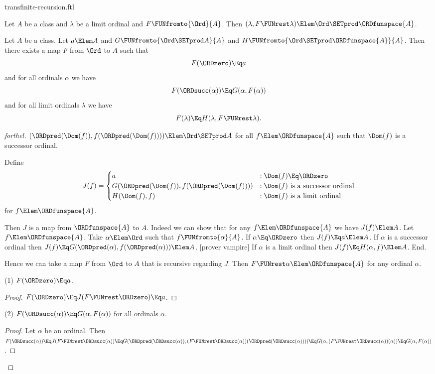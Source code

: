 \documentclass{stex}
\begin{document}
\begin{smodule}{transfinite-recursion.ftl}
\begin{lemma}[forthel]
  Let $A$ be a class and $\lambda$ be a limit ordinal and $F \FUNfromto{\Ord}{A}$.
  Then $(\lambda, F \FUNrest \lambda) \Elem \Ord \SETprod \ORDfunspace{A}$.
\end{lemma}

\begin{corollary}[forthel]
  Let $A$ be a class.
  Let $a \Elem A$ and $G \FUNfromto{\Ord \SETprod A}{A}$ and $H \FUNfromto{\Ord \SETprod \ORDfunspace{A}}{A}$.
  Then there exists a map $F$ from $\Ord$ to $A$ such that
  \[ F(\ORDzero) \Eq a \]
  and for all ordinals $\alpha$ we have
  \[ F(\ORDsucc(\alpha)) \Eq G(\alpha, F(\alpha)) \]
  and for all limit ordinals $\lambda$ we have
  \[ F(\lambda) \Eq H(\lambda, F \FUNrest \lambda). \]
\end{corollary}
\begin{proof}[forthel]
  $(\ORDpred(\Dom(f)), f(\ORDpred(\Dom(f)))) \Elem \Ord \SETprod A$ for all $f \Elem \ORDfunspace{A}$ such that $\Dom(f)$ is a successor ordinal.

  Define  \[ J(f) =
    \begin{cases}
      a
      & : \Dom(f) \Eq \ORDzero
      \\
      G(\ORDpred(\Dom(f)), f(\ORDpred(\Dom(f))))
      & : \text{$\Dom(f)$ is a successor ordinal}
      \\
      H(\Dom(f), f)
      & : \text{$\Dom(f)$ is a limit ordinal}
    \end{cases} \]
  for $f \Elem \ORDfunspace{A}$.

  Then $J$ is a map from $\ORDfunspace{A}$ to $A$.
  Indeed we can show that for any $f \Elem \ORDfunspace{A}$ we have $J(f) \Elem A$.
    Let $f \Elem \ORDfunspace{A}$.
    Take $\alpha \Elem \Ord$ such that $f \FUNfromto{\alpha}{A}$.
    If $\alpha \Eq \ORDzero$ then $J(f) \Eq a \Elem A$.
    If $\alpha$ is a successor ordinal then $J(f) \Eq
    G(\ORDpred(\alpha), f(\ORDpred(\alpha))) \Elem A$.
    [prover vampire]
    If $\alpha$ is a limit ordinal then $J(f) \Eq H(\alpha, f) \Elem A$.
  End.

  Hence we can take a map $F$ from $\Ord$ to $A$ that is recursive regarding $J$.
  Then $F \FUNrest \alpha \Elem \ORDfunspace{A}$ for any ordinal $\alpha$.

  (1) $F(\ORDzero) \Eq a$.
  \begin{proof}
    $F(\ORDzero)
      \Eq J(F \FUNrest \ORDzero)
      \Eq a$.
  \end{proof}

  (2) $F(\ORDsucc(\alpha)) \Eq G(\alpha, F(\alpha))$ for all ordinals $\alpha$.
  \begin{proof}
    Let $\alpha$ be an ordinal.
    Then $F(\ORDsucc(\alpha))
      \Eq J(F \FUNrest \ORDsucc(\alpha))
      \Eq G(\ORDpred(\ORDsucc(\alpha)), (F \FUNrest \ORDsucc(\alpha))(\ORDpred(\ORDsucc(\alpha))))
      \Eq G(\alpha, (F \FUNrest \ORDsucc(\alpha))(\alpha))
      \Eq G(\alpha, F(\alpha))$.
  \end{proof}


\end{proof}
\end{smodule}
\end{document}
